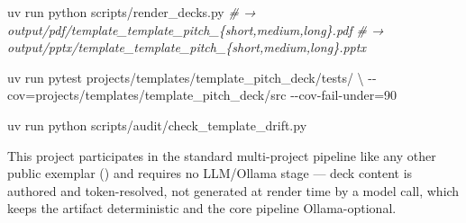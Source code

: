 \documentclass[
]{article}
\newenvironment{Shaded}{}{}
\newcommand{\AttributeTok}[1]{\textcolor[rgb]{0.49,0.56,0.16}{#1}}
\newcommand{\CommentTok}[1]{\textcolor[rgb]{0.38,0.63,0.69}{\textit{#1}}}
\newcommand{\DataTypeTok}[1]{\textcolor[rgb]{0.56,0.13,0.00}{#1}}
\newcommand{\ExtensionTok}[1]{#1}
\newcommand{\NormalTok}[1]{#1}
\newcommand{\OperatorTok}[1]{\textcolor[rgb]{0.40,0.40,0.40}{#1}}
\begin{document}
\begin{Shaded}
\begin{Highlighting}[]
\ExtensionTok{uv}\NormalTok{ run python scripts/render\_decks.py}
\CommentTok{\# → output/pdf/template\_template\_pitch\_\{short,medium,long\}.pdf}
\CommentTok{\# → output/pptx/template\_template\_pitch\_\{short,medium,long\}.pptx}

\ExtensionTok{uv}\NormalTok{ run pytest projects/templates/template\_pitch\_deck/tests/ }\DataTypeTok{\textbackslash{}}
  \AttributeTok{{-}{-}cov}\OperatorTok{=}\NormalTok{projects/templates/template\_pitch\_deck/src }\AttributeTok{{-}{-}cov{-}fail{-}under}\OperatorTok{=}\NormalTok{90}

\ExtensionTok{uv}\NormalTok{ run python scripts/audit/check\_template\_drift.py}
\end{Highlighting}
\end{Shaded}

This project participates in the standard multi-project pipeline like
any other public exemplar
()
and requires no LLM/Ollama stage --- deck content is authored and
token-resolved, not generated at render time by a model call, which
keeps the artifact deterministic and the core pipeline Ollama-optional.

\newpage



\clearpage


\end{document}
